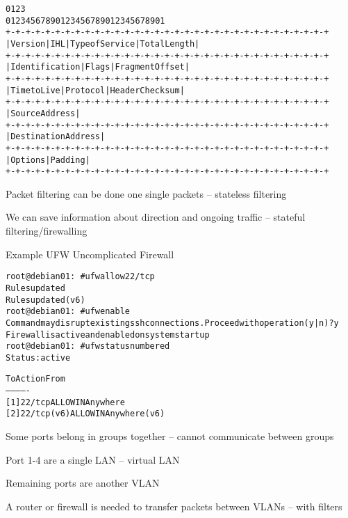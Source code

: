 \documentclass[Screen16to9,17pt]{foils}
\begin{document}
\begin{alltt}\footnotesize
0                   1                   2                   3
0 1 2 3 4 5 6 7 8 9 0 1 2 3 4 5 6 7 8 9 0 1 2 3 4 5 6 7 8 9 0 1
+-+-+-+-+-+-+-+-+-+-+-+-+-+-+-+-+-+-+-+-+-+-+-+-+-+-+-+-+-+-+-+-+
|Version|  IHL  |Type of Service|          Total Length         |
+-+-+-+-+-+-+-+-+-+-+-+-+-+-+-+-+-+-+-+-+-+-+-+-+-+-+-+-+-+-+-+-+
|         Identification        |Flags|      Fragment Offset    |
+-+-+-+-+-+-+-+-+-+-+-+-+-+-+-+-+-+-+-+-+-+-+-+-+-+-+-+-+-+-+-+-+
|  Time to Live |    Protocol   |         Header Checksum       |
+-+-+-+-+-+-+-+-+-+-+-+-+-+-+-+-+-+-+-+-+-+-+-+-+-+-+-+-+-+-+-+-+
|                       Source Address                          |
+-+-+-+-+-+-+-+-+-+-+-+-+-+-+-+-+-+-+-+-+-+-+-+-+-+-+-+-+-+-+-+-+
|                    Destination Address                        |
+-+-+-+-+-+-+-+-+-+-+-+-+-+-+-+-+-+-+-+-+-+-+-+-+-+-+-+-+-+-+-+-+
|                    Options                    |    Padding    |
+-+-+-+-+-+-+-+-+-+-+-+-+-+-+-+-+-+-+-+-+-+-+-+-+-+-+-+-+-+-+-+-+
\end{alltt}

\begin{list1}
\item Packet filtering can be done one single packets -- stateless filtering
\item We can save information about direction and ongoing traffic -- stateful filtering/firewalling
\end{list1}


Example UFW Uncomplicated Firewall
\begin{alltt}\footnotesize
root@debian01:~# ufw allow 22/tcp
Rules updated
Rules updated (v6)
root@debian01:~# ufw enable
Command may disrupt existing ssh connections. Proceed with operation (y|n)? y
Firewall is active and enabled on system startup
root@debian01:~# ufw status numbered
Status: active

     To                         Action      From
     --                         ------      ----
[ 1] 22/tcp                     ALLOW IN    Anywhere
[ 2] 22/tcp (v6)                ALLOW IN    Anywhere (v6)
\end{alltt}






\begin{list1}
\item Some ports belong in groups together -- cannot communicate between groups
\item Port 1-4 are a single LAN -- virtual LAN
\item Remaining ports are another VLAN
\item A router or firewall is needed to transfer packets between VLANs -- with filters
\end{list1}
\end{document}

